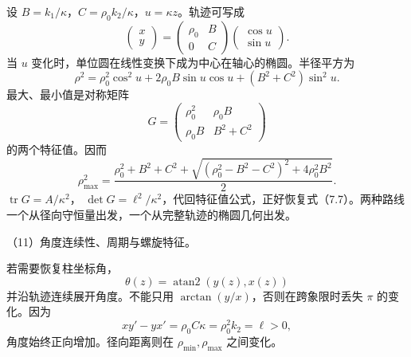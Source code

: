 \documentclass[12pt,a4paper,fontset=fandol]{ctexart}
\begin{document}
设 \(B=k_1/\kappa\)，\(C=\rho_0k_2/\kappa\)，\(u=\kappa z\)。轨迹可写成
\[
\begin{pmatrix}x\\y\end{pmatrix}
=
\begin{pmatrix}\rho_0&B\\0&C\end{pmatrix}
\begin{pmatrix}\cos u\\\sin u\end{pmatrix}.
\] 当 \(u\) 变化时，单位圆在线性变换下成为中心在轴心的椭圆。半径平方为
\[
\rho^2=\rho_0^2\cos^2u+2\rho_0B\sin u\cos u
+(B^2+C^2)\sin^2u.
\] 最大、最小值是对称矩阵 \[
G=
\begin{pmatrix}
\rho_0^2&\rho_0B\\
\rho_0B&B^2+C^2
\end{pmatrix}
\] 的两个特征值。因而 \[
\boxed{\rho_{\max}^2=
\frac{\rho_0^2+B^2+C^2+
\sqrt{(\rho_0^2-B^2-C^2)^2+4\rho_0^2B^2}}2.}\tag{7.11}
\] \(\operatorname{tr}G=A/\kappa^2\)，
\(\det G=\ell^2/\kappa^2\)，代回特征值公式，正好恢复式（7.7）。两种路线一个从径向守恒量出发，一个从完整轨迹的椭圆几何出发。

\begin{center}
\begin{minipage}{\linewidth}
\centering\begingroup
{}
\ifdim\wd\diagrambox>.88\linewidth
\sbox{\diagrambox}{\resizebox{.88\linewidth}{!}{\usebox{\diagrambox}}}
\fi
\ifdim\ht\diagrambox>.40\textheight
\resizebox{!}{.40\textheight}{\usebox{\diagrambox}}
\else\usebox{\diagrambox}\fi
\par{}
\endgroup\end{minipage}
\end{center}

（11）角度连续性、周期与螺旋特征。

若需要恢复柱坐标角， \[
\theta(z)=\operatorname{atan2}(y(z),x(z))
\] 并沿轨迹连续展开角度。不能只用 \(\arctan(y/x)\)，否则在跨象限时丢失
\(\pi\) 的变化。因为 \[
xy'-yx'=\rho_0C\kappa=\rho_0^2k_2=\ell>0,
\] 角度始终正向增加。径向距离则在 \(\rho_{\min},\rho_{\max}\) 之间变化。
\end{document}
